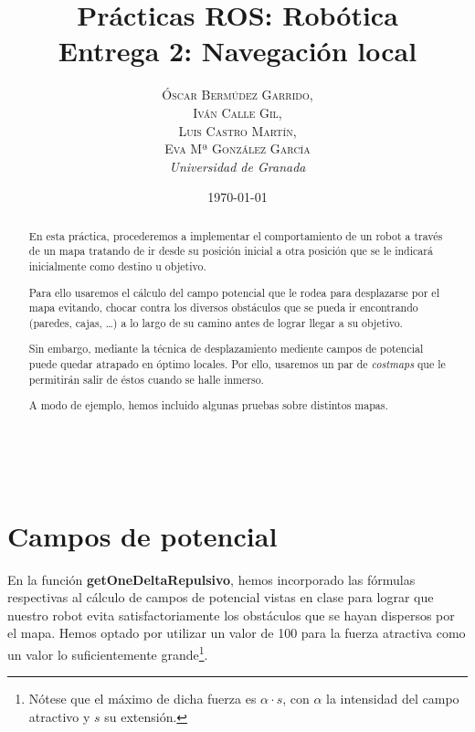 \documentclass[a4paper, 11pt]{article}
\title{\textbf{Prácticas ROS: Robótica}\\ %
Entrega 2: Navegación local} %
\author{\textsc{Óscar Bermúdez Garrido,\\Iván Calle Gil,\\ Luis Castro Martín,\\ Eva Mª González García} %
\\{\textit{Universidad de Granada}}} %
\date{\today} %
\makeatletter
\renewcommand{\maketitle}{
  \begin{flushright} %
  
  {\LARGE\@title} %
  
  \vspace{50pt} %
  
  {\large\@author} %
  \\\@date %
  \vspace{40pt} %
  \end{flushright}
}
\makeatother
\begin{document}
\maketitle %

\renewcommand{\abstractname}{Resumen} %
\begin{abstract}
	En esta práctica, procederemos a implementar el comportamiento de un robot a través de un mapa
	tratando de ir desde su posición inicial a otra posición que se le indicará inicialmente como
	destino u objetivo.
	
	Para ello usaremos el cálculo del campo potencial que le rodea para desplazarse por el mapa evitando,
	chocar contra los diversos obstáculos que se pueda ir encontrando (paredes, cajas, \dots) a lo largo
	de su camino antes de lograr llegar a su objetivo.

	Sin embargo, mediante la técnica de desplazamiento mediente campos de potencial puede quedar atrapado
	en óptimo locales. Por ello, usaremos un par de \textit{costmaps} que le permitirán salir de éstos
	cuando se halle inmerso.
	
	A modo de ejemplo, hemos incluido algunas pruebas sobre distintos mapas.
	
	
\end{abstract}


{\parskip=2pt
  \tableofcontents
}
\pagebreak


\section{Campos de potencial}
	En la función \textbf{getOneDeltaRepulsivo}, hemos incorporado las fórmulas respectivas al cálculo
	de campos de potencial vistas en clase para lograr que nuestro robot evita satisfactoriamente los
	obstáculos que se hayan dispersos por el mapa. Hemos optado por utilizar un valor de 100  para
	la fuerza atractiva como un valor lo suficientemente grande\footnote{Nótese que el máximo de dicha
	fuerza es $\alpha \cdot s$, con $\alpha$ la intensidad del campo atractivo y $s$ su extensión.}.
	
\end{document}
